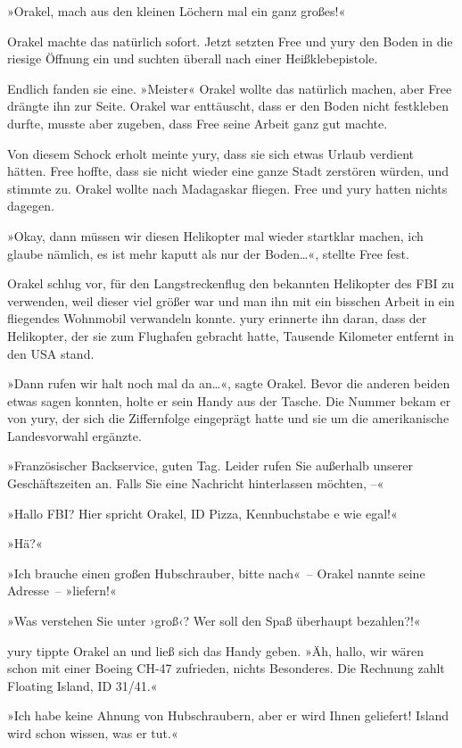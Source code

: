 »Orakel, mach aus den kleinen Löchern mal ein ganz großes!«

Orakel machte das natürlich sofort. Jetzt setzten Free und yury den Boden in die riesige Öffnung ein und suchten überall nach einer Heißklebepistole.

Endlich fanden sie eine. »Meister« Orakel wollte das natürlich machen, aber Free drängte ihn zur Seite. Orakel war enttäuscht, dass er den Boden nicht festkleben durfte, musste aber zugeben, dass Free seine Arbeit ganz gut machte.

Von diesem Schock erholt meinte yury, dass sie sich etwas Urlaub verdient hätten. Free hoffte, dass sie nicht wieder eine ganze Stadt zerstören würden, und stimmte zu. Orakel wollte nach Madagaskar fliegen. Free und yury hatten nichts dagegen.

»Okay, dann müssen wir diesen Helikopter mal wieder startklar machen, ich glaube nämlich, es ist mehr kaputt als nur der Boden…«, stellte Free fest.

Orakel schlug vor, für den Langstreckenflug den bekannten Helikopter des FBI zu verwenden, weil dieser viel größer war und man ihn mit ein bisschen Arbeit in ein fliegendes Wohnmobil verwandeln konnte. yury erinnerte ihn daran, dass der Helikopter, der sie zum Flughafen gebracht hatte, Tausende Kilometer entfernt in den USA stand.

»Dann rufen wir halt noch mal da an…«, sagte Orakel. Bevor die anderen beiden etwas sagen konnten, holte er sein Handy aus der Tasche. Die Nummer bekam er von yury, der sich die Ziffernfolge eingeprägt hatte und sie um die amerikanische Landesvorwahl ergänzte.

»Französischer Backservice, guten Tag. Leider rufen Sie außerhalb unserer Geschäftszeiten an. Falls Sie eine Nachricht hinterlassen möchten, –«

»Hallo FBI? Hier spricht Orakel, ID Pizza, Kennbuchstabe e wie egal!«

»Hä?«

»Ich brauche einen großen Hubschrauber, bitte nach«~– Orakel nannte seine Adresse~– »liefern!«

»Was verstehen Sie unter ›groß‹? Wer soll den Spaß überhaupt bezahlen?!«

yury tippte Orakel an und ließ sich das Handy geben. »Äh, hallo, wir wären schon mit einer Boeing CH-47 zufrieden, nichts Besonderes. Die Rechnung zahlt Floating Island, ID 31/41.«

»Ich habe keine Ahnung von Hubschraubern, aber er wird Ihnen geliefert! Island wird schon wissen, was er tut.«

